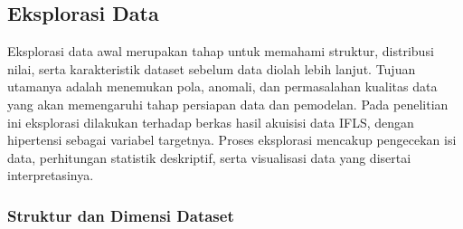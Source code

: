 








\subsection{Eksplorasi Data}
 
Eksplorasi data awal merupakan tahap untuk memahami struktur, distribusi nilai, serta karakteristik dataset sebelum data diolah lebih lanjut. Tujuan utamanya adalah menemukan pola, anomali, dan permasalahan kualitas data yang akan memengaruhi tahap persiapan data dan pemodelan. Pada penelitian ini eksplorasi dilakukan terhadap berkas hasil akuisisi data IFLS, dengan hipertensi sebagai variabel targetnya. Proses eksplorasi mencakup pengecekan isi data, perhitungan statistik deskriptif, serta visualisasi data yang disertai interpretasinya.
 
\subsubsection{Struktur dan Dimensi Dataset}
 
